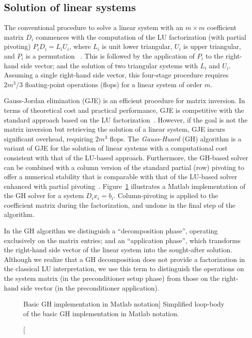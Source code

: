 \subsection{Solution of linear systems}
The conventional procedure to solve a linear system with 
an $m\times m$ coefficient matrix $D_i$
commences with
the computation of the LU factorization (with partial pivoting)
$P_iD_i=L_iU_i$, where $L_i$ is unit lower triangular, $U_i$ is upper triangular, and $P_i$ is a permutation
~\cite{GVL3}. This is followed by the
application of $P_i$ to the right-hand side vector; and the solution
of two triangular systems with $L_i$ and $U_i$.
Assuming a single right-hand side vector, this four-stage procedure requires $2m^3/3$ floating-point operations (flops) for a linear system of order
$m$.

Gauss-Jordan elimination (GJE) is an efficient procedure for matrix inversion.
In terms of theoretical cost and practical performance, GJE is competitive with the standard
approach based on the LU factorization~\cite{doi:10.1137/S1064827598345679,CPE:CPE2933}.
However, if the goal is not the matrix inversion but retrieving the solution of a linear system,
GJE incurs significant overhead, requiring $2m^3$ flops.
The {\it Gauss-Huard} (GH) algorithm is a variant of GJE for the solution of linear systems
with a computational cost consistent with that of the LU-based approach.
Furthermore, the GH-based solver can be combined with a column version of the standard partial (row) pivoting
to offer a numerical stability that is comparable with that of the LU-based solver enhanced with partial pivoting~\cite{Dek97}.
Figure~\ref{2017-gh-block-jacobi:fig:gh} illustrates a Matlab implementation of the GH solver for a system
$D_i x_i = b_i$. 
Column-pivoting is applied to the coefficient matrix during the factorization,
and undone in the final step of the algorithm. 

In the GH algorithm we distinguish a ``decomposition phase'',
operating exclusively on the matrix entries; and an ``application phase'', which transforms the right-hand side 
vector of the linear system into the sought-after solution.
Although we realize that a GH decomposition does not provide a factorization
in the classical LU interpretation,
we use this term to distinguish the operations on the system matrix (in the preconditioner setup phase)
from those on the right-hand side vector (in the preconditioner application).

\begin{figure}[t]
\begin{center}
\begin{minipage}{0.80\columnwidth}

\end{minipage}
\caption
[Basic GH implementation in Matlab notation]
{Simplified loop-body of the basic GH implementation in Matlab notation.}
\label{2017-gh-block-jacobi:fig:gh}
\end{center}
\end{figure}

